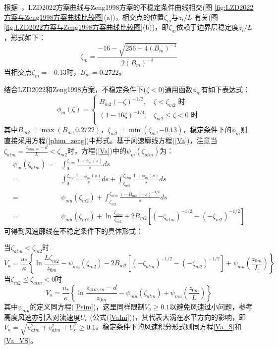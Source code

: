 根据~\citet{liu2023referenceheight}，LZD2022方案曲线与Zeng1998方案的不稳定条件曲线相交(图 \ref{fig:LZD2022方案与Zeng1998方案曲线比较图}(a))，相交点的位置$\zeta_{m}$与${z_{i}}/{L}$
有关(图 \ref{fig:LZD2022方案与Zeng1998方案曲线比较图}(b))，即$\zeta_{m}$依赖于边界层稳定度${z_{i}}/{L}$，形式如下：
\begin{equation}
     \zeta_{m}=\frac{-16-\sqrt{256+4 \left(B_{m}\right)^{-4}}}{2 \left(B_{m}\right)^{-4}}
\end{equation}
当相交点$\zeta_{m}=-0.13$时，$B_{m}=0.2722$。

结合LZD2022和Zeng1998方案，不稳定条件下($\zeta<0$)通用函数$\phi_{m}$有如下表达式：
\begin{equation}
\phi_{m}(\zeta)= \begin{cases}
   B_{m2}(-\zeta)^{-1/2}, & \zeta<\zeta_{m2} \text { 时} \\
   (1-16 \zeta)^{-1/4}, & \zeta_{m2} \leq \zeta<0 \text { 时} \\
\end{cases}
\end{equation}
其中$B_{m2}=\max(B_{m},0.2722)$，$\zeta_{m2}=\min(\zeta_{m},-0.13)$，稳定条件下的$\phi_{m}$则直接采用方程(\ref{phim_zeng})中形式。基于风速廓线方程(\ref{Va})，注意当
$\zeta_{atm}=\frac{z_{atm,m}-d}{L}<\zeta_{m2}$时，方程(\ref{Va})中的$\psi_{m}\left(\zeta_{atm}\right)$为：
\begin{align}
\psi_{m}\left(\zeta_{atm}\right) =& \int_{0}^{\zeta_{atm}} \frac{1-\phi_{m}(s)}{s} d s  \nonumber \\
 =& \int_{0}^{\zeta_{m2}} \frac{1-\phi_{m}(s)}{s} d s + \int_{\zeta_{m2}}^{\zeta_{atm}} \frac{1-\phi_{m}(s)}{s} d s  \nonumber \\
 =& \psi_{mu}(\zeta_{m2}) + \int_{\zeta_{m2}}^{\zeta_{atm}} \frac{1-B_{m2}(-s)^{-1/2}}{s} d s  \nonumber \\
 =& \psi_{mu}(\zeta_{m2}) + \ln \frac{\zeta_{atm}}{\zeta_{m2}} + 2B_{m2}\left[(-\zeta_{atm})^{-1/2}-(-\zeta_{m2})^{-1/2}\right]
\end{align}
可得到风速廓线在不稳定条件下的具体形式：

\noindent 当$\zeta_{atm}<\zeta_{m2}$时
\begin{equation}\label{Va_U_LZD1}
V_{a}=\frac{u_{*}}{\kappa}\left\{\ln \frac{L\zeta_{m2}}{z_{0 m}}-\psi_{mu}\left(\zeta_{m2}\right)-2B_{m2}\left[(-\zeta_{atm})^{-1/2}-(-\zeta_{m2})^{-1/2}\right]+\psi_{mu}\left(\frac{z_{0 m}}{L}\right)\right\}
\end{equation}
\noindent 当$ \zeta_{m2} \leq \zeta_{atm}<0$时
\begin{equation}\label{Va_U_LZD2}
V_{a}=\frac{u_{*}}{\kappa}\left\{\ln \frac{z_{atm, m}-d}{z_{0 m}}-\psi_{mu}\left(\zeta_{atm}\right)+\psi_{mu}\left(\frac{z_{0 m}}{L}\right)\right\}
\end{equation}
其中$\psi_{mu}$的定义同方程(\ref{Psim})，这里同样限制$V_a\geq0.1$以避免风速过小问题，参考高度风速亦引入对流速度$U_c$ (公式(\ref{VaIni}))，其代表大涡在水平方向的影响，即
$V_{a}=\sqrt{u_{atm}^{2}+v_{atm}^{2}+U_{c}^{2}} \geq 0.1$。稳定条件下的风速积分形式则同方程\eqref{Va_S}和\eqref{Va_VS}。

